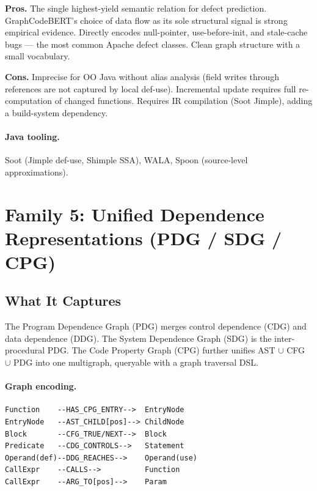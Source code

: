 \documentclass[12pt,a4paper]{article}
\begin{document}
\begin{prosbox}
\textbf{Pros.}
The single highest-yield semantic relation for defect prediction.
GraphCodeBERT's choice of data flow as its sole structural signal is strong
empirical evidence. Directly encodes null-pointer, use-before-init, and
stale-cache bugs --- the most common Apache defect classes. Clean graph
structure with a small vocabulary.
\end{prosbox}

\begin{consbox}
\textbf{Cons.}
Imprecise for OO Java without alias analysis (field writes through references
are not captured by local def-use). Incremental update requires full
re-computation of changed functions. Requires IR compilation (Soot Jimple),
adding a build-system dependency.
\end{consbox}

\paragraph{Java tooling.} Soot (Jimple def-use, Shimple SSA), WALA, Spoon
(source-level approximations).

\section{Family 5: Unified Dependence Representations (PDG / SDG / CPG)}
\label{sec:pdg}

\subsection{What It Captures}

The Program Dependence Graph (PDG) merges control dependence (CDG) and data
dependence (DDG). The System Dependence Graph (SDG) is the inter-procedural PDG.
The Code Property Graph (CPG) further unifies AST $\cup$ CFG $\cup$ PDG into
one multigraph, queryable with a graph traversal DSL.

\paragraph{Graph encoding.}
\begin{lstlisting}
Function    --HAS_CPG_ENTRY-->  EntryNode
EntryNode   --AST_CHILD[pos]--> ChildNode
Block       --CFG_TRUE/NEXT-->  Block
Predicate   --CDG_CONTROLS-->   Statement
Operand(def)--DDG_REACHES-->    Operand(use)
CallExpr    --CALLS-->          Function
CallExpr    --ARG_TO[pos]-->    Param
\end{lstlisting}
\end{document}
